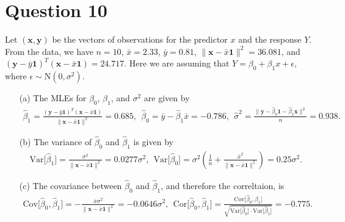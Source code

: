 \documentclass[10pt]{article}
\begin{document}
\section{Question 10} \noindent
Let \((\mathbf{x}, \mathbf{y})\) be the vectors of observations for the predictor \(x\) and the response \(Y\). 
From the data, we have \(n = 10\), \(\bar{x} = 2.33\), \(\bar{y} = 0.81\), \(\| \mathbf{x} - \bar{x}\mathbf{1} \|^2 = 36.081\), and 
\((\mathbf{y} - \bar{y}\mathbf{1})^T(\mathbf{x} - \bar{x}\mathbf{1}) = 24.717\).
Here we are assuming that \(Y = \beta_0 + \beta_1 x + \epsilon\), where \(\epsilon \sim \mathrm{N}(0, \sigma^2)\).
\begin{itemize}
    \item[(a)] The MLEs for \(\beta_0\), \(\beta_1\), and \(\sigma^2\) are given by 
    \begin{align*}
        \hat{\beta}_{1}
        = \frac{(\mathbf{y} - \bar{y}\mathbf{1})^T(\mathbf{x} - \bar{x}\mathbf{1})}{\| \mathbf{x} - \bar{x}\mathbf{1} \|^2}
        = 0.685
        ,~~
        \hat{\beta}_0
        = \bar{y} - \hat{\beta}_1 \bar{x}
        = -0.786
        ,~~
        \hat{\sigma}^2
        = \frac{\| \mathbf{y} - \hat{\beta}_0 \mathbf{1} - \hat{\beta}_1 \mathbf{x} \|^2}{n}
        = 0.938.
    \end{align*}
    \item[(b)] The variance of \(\hat{\beta}_0\) and \(\hat{\beta}_1\) is given by 
    \begin{align*}
        \mathrm{Var}\big[ \hat{\beta}_1 \big]
        = \frac{\sigma^2}{\| \mathbf{x} - \bar{x}\mathbf{1} \|^2}
        = 0.0277 \sigma^2
        ,~~
        \mathrm{Var}\big[ \hat{\beta}_0 \big]
        = \sigma^2 \left( \frac{1}{n} + \frac{\bar{x}^2}{\| \mathbf{x} - \bar{x}\mathbf{1} \|^2} \right)
        = 0.25 \sigma^2.
    \end{align*}
    \item[(c)] The covariance between \(\hat{\beta}_0\) and \(\hat{\beta}_1\), and therefore the correltaion, is 
    \begin{align*}
        \mathrm{Cov}\big[ \hat{\beta}_0, \hat{\beta}_1 \big]
        = - \frac{\bar{x} \sigma^2}{\| \mathbf{x} - \bar{x}\mathbf{1} \|^2}
        = -0.0646 \sigma^2
        ,~~
        \mathrm{Cor}\big[ \hat{\beta}_0, \hat{\beta}_1 \big] 
        = \frac{\mathrm{Cov}\big[ \hat{\beta}_0, \hat{\beta}_1 \big]}{\sqrt{\mathrm{Var}\big[ \hat{\beta}_0 \big] \cdot \mathrm{Var}\big[ \hat{\beta}_1 \big]}}
        = -0.775.
    \end{align*}
\end{itemize}
\end{document}
